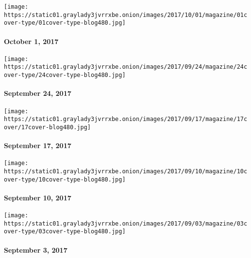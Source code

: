 \texttt{[image: https://static01.graylady3jvrrxbe.onion/images/2017/10/01/magazine/01cover-type/01cover-type-blog480.jpg]}

\hypertarget{october-1-2017}{%
\paragraph{October 1, 2017}\label{october-1-2017}}

\href{https://www.nytimes3xbfgragh.onion/interactive/2017/09/21/magazine/voyages-issue-photographs-family-vacations-around-world.html}{}

\texttt{[image: https://static01.graylady3jvrrxbe.onion/images/2017/09/24/magazine/24cover-type/24cover-type-blog480.jpg]}

\hypertarget{september-24-2017}{%
\paragraph{September 24, 2017}\label{september-24-2017}}

\href{https://www.nytimes3xbfgragh.onion/issue/magazine/2017/09/15/91717-issue}{}

\texttt{[image: https://static01.graylady3jvrrxbe.onion/images/2017/09/17/magazine/17cover/17cover-blog480.jpg]}

\hypertarget{september-17-2017}{%
\paragraph{September 17, 2017}\label{september-17-2017}}

\href{https://www.nytimes3xbfgragh.onion/issue/magazine/2017/09/08/91017-issue}{}

\texttt{[image: https://static01.graylady3jvrrxbe.onion/images/2017/09/10/magazine/10cover-type/10cover-type-blog480.jpg]}

\hypertarget{september-10-2017}{%
\paragraph{September 10, 2017}\label{september-10-2017}}

\href{https://www.nytimes3xbfgragh.onion/issue/magazine/2017/09/01/90317-issue}{}

\texttt{[image: https://static01.graylady3jvrrxbe.onion/images/2017/09/03/magazine/03cover-type/03cover-type-blog480.jpg]}

\hypertarget{september-3-2017}{%
\paragraph{September 3, 2017}\label{september-3-2017}}

